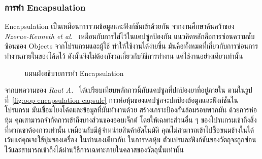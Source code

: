 \documentclass[12pt,one side,openright,a4paper]{cpe-thesis-th}
\newcommand{\thaijustify}[1]{%
  \par\hspace{30pt}\justifying
  #1
}
\begin{document}
        \subsubsection{การทำ Encapsulation}
            \thaijustify{
                Encapsulation เป็นเหมือนการรวมข้อมูลและฟังก์ชันเข้าด้วยกัน จากงานศึกษาค้นคว้าของ \textit{Nzerue-Kenneth et al.}~\cite{nzeruekenneth23polymorph} เหมือนกับการใส่ไว้ในแคปซูลป้องกัน แนวคิดหลักคือการซ่อนความซับซ้อนของ Objects จากโปรแกรมและผู้ใช้ ทำให้ใช้งานได้ง่ายขึ้น มันคือทั้งหมดที่เกี่ยวกับการซ่อนการทำงานภายในของโค้ดไว้ ดังนั้นจึงไม่ต้องกังวลเกี่ยวกับวิธีการทำงาน แค่ใช้งานอย่างเดียวเท่านั้น
            }
            \begin{figure}[H]
                \centering
                \caption[แผนผังอธิบายการทำ Encapsulation]{แผนผังอธิบายการทำ Encapsulation}
                \label{fig:oop-encapsulation}
            \end{figure}
            \thaijustify{
                จากบทความของ \textit{Raut A.}~\cite{raut22encapsule} ได้เปรียบเทียบหลักการนี้กับแคปซูลที่ปกป้องยาที่อยู่ภายใน ตามในรูปที่~\ref{fig:oop-encapsulation-capsule} การห่อหุ้มของแคปซูลจะปกป้องข้อมูลและฟังก์ชันในโปรแกรม มันเชื่อมโยงโค้ดและข้อมูลที่มันทำงานด้วย สร้างเกราะป้องกันล้อมรอบพวกมัน ด้วยการห่อหุ้ม คุณสามารถจำกัดการเข้าถึงบางส่วนของออบเจ็กต์ โดยให้เฉพาะส่วนอื่น ๆ ของโปรแกรมเข้าถึงสิ่งที่พวกเขาต้องการเท่านั้น เหมือนกับมีตู้จำหน่ายสินค้าอัตโนมัติ คุณไม่สามารถเข้าไปซื้อขนมข้างในได้เว้นแต่คุณจะใช้ปุ่มของเครื่อง ในทำนองเดียวกัน ในการห่อหุ้ม ตัวแปรและฟังก์ชันของวัตถุจะถูกซ่อนไว้และสามารถเข้าถึงได้ผ่านวิธีการเฉพาะภายในคลาสของวัตถุนั้นเท่านั้น
            }
\end{document}
